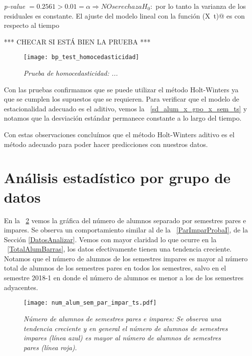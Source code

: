 \textit{p-value} $= 0.2561 > 0.01 = \alpha \Rightarrow NO se rechaza H_{0}:$ por lo tanto la varianza de los residuales es constante. El ajuste del modelo lineal con la función \verb@lm(X~t)@ es con respecto al tiempo

*** CHECAR SI ESTÁ BIEN LA PRUEBA ***

\begin{figure}[H]
\centering
\texttt{[image: bp\_test\_homocedasticidad]} %
\caption[\textit{Prueba de homocedasticidad}]{\textit{Prueba de homocedasticidad: ...}}\label{bpTest_homocedasticidad}
\end{figure}




Con las pruebas  confirmamos que se puede utilizar el método Holt-Winters ya que se cumplen los supuestos que se requieren. Para verificar que el modelo de estacionalidad adecuado es el aditivo, vemos la \figurename{~\ref{sd_alum_x_gpo_x_sem_ts}} y notamos que la desviación estándar permanece constante a lo largo del tiempo.

Con estas observaciones concluímos que el método Holt-Winters aditivo es el método adecuado para poder hacer predicciones con nuestros datos.

\section{Análisis estadístico por grupo de datos} \label{AE_x_GpoDeDatos}

En la \figurename{~\ref{NumAlTotal_ParImpar_ts}} vemos la gráfica del número de alumnos separado por semestres pares e impares. Se observa un comportamiento similar al de la \figurename{~\ref{ParImparProbaI}}, de la Sección \ref{DatosAnalizar}. Vemos con mayor claridad lo que ocurre en la \figurename{~\ref{TotalAlumBarras}}, los datos efectivamente tienen una tendencia creciente. Notamos que el número de alumnos de los semestres impares es mayor al número total de alumnos de los semestres pares en todos los semestres, salvo en el semestre 2018-1 en donde el número de alumnos es menor a los de los semestres adyacentes.%

\begin{figure}[H]
\centering
\texttt{[image: num\_alum\_sem\_par\_impar\_ts.pdf]} %
\caption[\textit{Número de alumnos de semestres pares e impares}]{\textit{Número de alumnos de semestres pares e impares: Se observa una tendencia creciente y en general el número de alumnos de semestres impares (línea azul) es mayor al número de alumnos de semestres pares (línea roja).}}\label{NumAlTotal_ParImpar_ts}
\end{figure}


